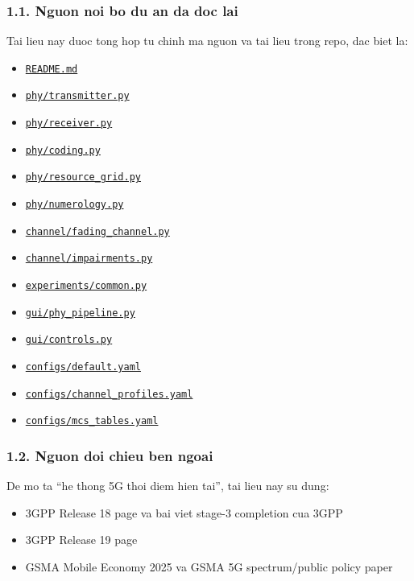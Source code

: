 \documentclass[
  vietnamese,
  a4paper,
  11pt]{article}
\providecommand{\tightlist}{%
  \setlength{\itemsep}{0pt}\setlength{\parskip}{0pt}}
\begin{document}
\subsubsection{1.1. Nguon noi bo du an da doc
lai}\label{nguon-noi-bo-du-an-da-doc-lai}

Tai lieu nay duoc tong hop tu chinh ma nguon va tai lieu trong repo, dac
biet la:

\begin{itemize}
\tightlist
\item
  \href{../README.md}{\texttt{README.md}}
\item
  \href{../phy/transmitter.py}{\texttt{phy/transmitter.py}}
\item
  \href{../phy/receiver.py}{\texttt{phy/receiver.py}}
\item
  \href{../phy/coding.py}{\texttt{phy/coding.py}}
\item
  \href{../phy/resource_grid.py}{\texttt{phy/resource\_grid.py}}
\item
  \href{../phy/numerology.py}{\texttt{phy/numerology.py}}
\item
  \href{../channel/fading_channel.py}{\texttt{channel/fading\_channel.py}}
\item
  \href{../channel/impairments.py}{\texttt{channel/impairments.py}}
\item
  \href{../experiments/common.py}{\texttt{experiments/common.py}}
\item
  \href{../gui/phy_pipeline.py}{\texttt{gui/phy\_pipeline.py}}
\item
  \href{../gui/controls.py}{\texttt{gui/controls.py}}
\item
  \href{../configs/default.yaml}{\texttt{configs/default.yaml}}
\item
  \href{../configs/channel_profiles.yaml}{\texttt{configs/channel\_profiles.yaml}}
\item
  \href{../configs/mcs_tables.yaml}{\texttt{configs/mcs\_tables.yaml}}
\end{itemize}

\subsubsection{1.2. Nguon doi chieu ben
ngoai}\label{nguon-doi-chieu-ben-ngoai}

De mo ta ``he thong 5G thoi diem hien tai'', tai lieu nay su dung:

\begin{itemize}
\tightlist
\item
  3GPP Release 18 page va bai viet stage-3 completion cua 3GPP
\item
  3GPP Release 19 page
\item
  GSMA Mobile Economy 2025 va GSMA 5G spectrum/public policy paper
\end{itemize}
\end{document}
